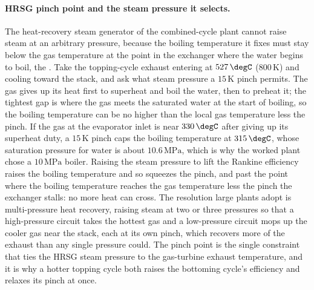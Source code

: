 \paragraph{HRSG pinch point and the steam pressure it selects.} The
heat-recovery steam generator of the combined-cycle plant cannot raise steam at an
arbitrary pressure, because the boiling temperature it fixes must stay below the
gas temperature at the point in the exchanger where the water begins to boil, the
. Take the topping-cycle exhaust entering at $527\,\degC$
($800\,\si{\kelvin}$) and cooling toward the stack, and ask what steam pressure a
$15\,\si{\kelvin}$ pinch permits. The gas gives up its heat first to superheat and
boil the water, then to preheat it; the tightest gap is where the gas meets the
saturated water at the start of boiling, so the boiling temperature can be no
higher than the local gas temperature less the pinch. If the gas at the
evaporator inlet is near $330\,\degC$ after giving up its superheat duty, a
$15\,\si{\kelvin}$ pinch caps the boiling temperature at $315\,\degC$, whose
saturation pressure for water is about $10.6\,\text{MPa}$, which is why the worked
plant chose a $10\,\text{MPa}$ boiler. Raising the steam pressure to lift the
Rankine efficiency raises the boiling temperature and so squeezes the pinch, and
past the point where the boiling temperature reaches the gas temperature less the
pinch the exchanger stalls: no more heat can cross. The resolution large plants
adopt is multi-pressure heat recovery, raising steam at two or three pressures so
that a high-pressure circuit takes the hottest gas and a low-pressure circuit
mops up the cooler gas near the stack, each at its own pinch, which recovers more
of the exhaust than any single pressure could. The pinch point is the single
constraint that ties the HRSG steam pressure to the gas-turbine exhaust
temperature, and it is why a hotter topping cycle both raises the bottoming
cycle's efficiency and relaxes its pinch at once.

